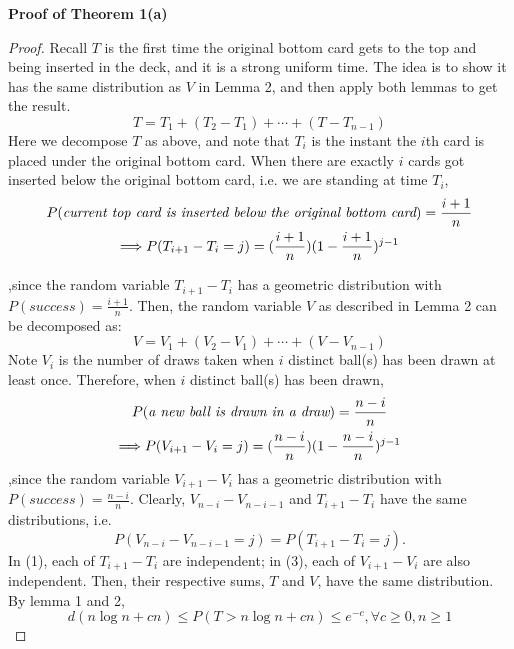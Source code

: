 \documentclass[12pt]{article}
\theoremstyle{plain}
\theoremstyle{definition}
\theoremstyle{remark}
\begin{document}
\textbf{Proof of Theorem 1(a)}
\begin{proof}
Recall $T$ is the first time the original bottom card gets to the top and being inserted in the deck, and it is a strong uniform time. The idea is to show it has the same distribution as $V$ in Lemma 2, and then apply both lemmas to get the result.
\begin{equation}
    T=T_1+(T_2-T_1)+\cdots+(T-T_{n-1})
\end{equation}
Here we decompose $T$ as above, and note that $T_i$ is the instant the $i$th card is placed under the original bottom card. When there are exactly $i$ cards got inserted below the original bottom card, i.e. we are standing at time $T_i$, 
\begin{gather}
P(\text{\it{current top card is inserted below the original bottom card}})=\frac{i+1}{n}\nonumber\\
\Longrightarrow P(T_{i+1}-T_i=j)=(\frac{i+1}{n})(1-\frac{i+1}{n})^{j-1}
\end{gather}


,since the random variable $T_{i+1}-T_i$ has a geometric distribution with $P(success)=\frac{i+1}{n}$. Then, the random variable $V$ as described in Lemma 2 can be decomposed as:
\begin{equation}
    V=V_1+(V_2-V_1)+\cdots+(V-V_{n-1})
\end{equation}
Note $V_i$ is the number of draws taken when $i$ distinct ball(s) has been drawn at least once. Therefore, when $i$ distinct ball(s) has been drawn,
\begin{gather}
P(\text{\it{a new ball is drawn in a draw}})=\frac{n-i}{n}\nonumber\\
\Longrightarrow P(V_{i+1}-V_i=j)=(\frac{n-i}{n})(1-\frac{n-i}{n})^{j-1}
\end{gather}
,since the random variable $V_{i+1}-V_i$ has a geometric distribution with $P(success)=\frac{n-i}{n}$. Clearly, $V_{n-i}-V_{n-i-1}$ and $T_{i+1}-T_i$ have the same distributions, i.e.
$$P(V_{n-i}-V_{n-i-1}=j)=P(T_{i+1}-T_i=j).$$
In (1), each of $T_{i+1}-T_i$ are independent; in (3), each of $V_{i+1}-V_i$ are also independent. Then, their respective sums, $T$ and $V$, have the same distribution. By lemma 1 and 2, $$ d(n\log n+cn)\leq  P(T>n\log n+cn)\leq e^{-c},\forall c\geq0,n\geq1$$
\end{proof}
\end{document}
